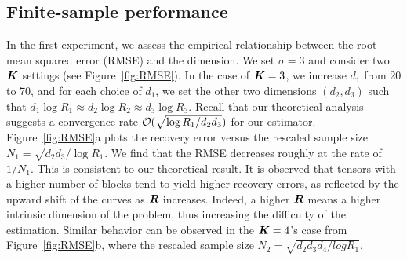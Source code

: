 \documentclass{article}
\begin{document}

\subsection{Finite-sample performance}
\vspace{-.2cm}


In the first experiment, we assess the empirical relationship between the root mean squared error (RMSE) and the dimension. We set $\sigma=3$ and consider two  $\bm K$ settings (see Figure~\ref{fig:RMSE}). In the case of $\bm K=3$, we increase $d_1$ from 20 to 70, and for each choice of $d_1$, we set the other two dimensions $(d_2,d_3)$ such that $d_1\log R_1\approx d_2\log R_2\approx d_3\log R_3$. Recall that our theoretical analysis suggests a convergence rate $\mathcal{O}(\sqrt{\log R_1/d_2d_3})$ for our estimator. Figure~\ref{fig:RMSE}a plots the recovery error versus the rescaled sample size $N_1=\sqrt{d_2d_3/\log R_1}$. We find that the RMSE decreases roughly at the rate of $1/N_1$. This is consistent to our theoretical result. It is observed that tensors with a higher number of blocks tend to yield higher recovery errors, as reflected by the upward shift of the curves as $\bm{R}$ increases. Indeed, a higher $\bm{R}$ means a higher intrinsic dimension of the problem, thus increasing the difficulty of the estimation. Similar behavior can be observed in the $\bm K=4$'s case from Figure~\ref{fig:RMSE}b, where the rescaled sample size $N_2 = \sqrt{d_2d_3d_4/logR_1}$.
\end{document}
